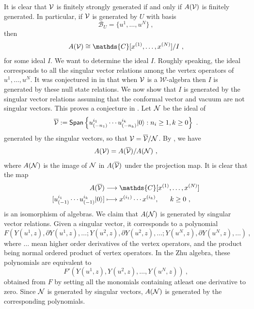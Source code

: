 \documentclass[a4paper,10pt]{article}
\newcommand{\C}{\mathds{C}}
\newcommand{\ov}[1]{\overline{#1}}
\def\CN {{\cal N}}
\def\CV {{\cal V}}
\begin{document}
It is clear that $\CV$ is finitely strongly generated if and only if $A(\CV)$ is finitely generated. In particular, if $\CV$ is generated by $U$ with basis 
\begin{equation}
    \mathcal{B}_U=\{u^1,\dots,u^N\}~,
\end{equation}
then 
\begin{equation}
    A(\CV)\cong\C[x^{(1)},\dots,x^{(N)}]/I~,
\end{equation}
for some ideal $I$. We want to determine the ideal $I$. Roughly speaking, the ideal corresponds to all the singular vector relations among the vertex operators of $u^1,\dots,u^N$. It was conjectured in  in \cite{Xie:2019zlb} that when $\CV$ is a $\mathcal{W}$-algebra then $I$ is generated by these null state relations. We now show that $I$ is generated by the singular vector relations assuming that the conformal vector and vacuum are not singular vectors. This proves a conjecture in \cite{Xie:2019zlb}. Let $\CN$ be the ideal of 
\begin{equation}
\ov{\CV}:= \mathsf{Span}\left\{u^{i_1}_{(-n_1)}\cdots u^{i_k}_{(-n_k)}|0\rangle:n_i\geq 1,k\geq 0\right\}~.   
\end{equation}
generated by the singular vectors, so that $\CV=\ov{\CV}/\CN$. 
By \cite[Proposition 1.4.2]{frenkel1992vertex}, we have 
\begin{equation}
A(\CV)=A(\ov{\CV})/A(\CN)~,    
\end{equation}
where $A(\CN)$ is the image of $\CN$ in $A(\ov{\CV})$ under the projection map. It is clear that the map
\begin{equation}
\begin{split}
    A(\ov{\CV})&\longrightarrow\C[x^{(1)},\dots,x^{(N)}] 
    \\
    [u^{i_1}_{(-1)}\cdots u^{i_k}_{(-1)}|0\rangle]&\longmapsto x^{(i_1)}\cdots x^{(i_k)},~~~~~k\geq 0~,
\end{split} 
\end{equation}
is an isomorphism of algebras. 
We claim that $A(\CN)$ is generated by singular vector relations. Given a singular vector, it corresponds to a polynomial 
\begin{equation}
    F(Y(u^1,z),\partial Y(u^1,z),\dots;Y(u^2,z),\partial Y(u^2,z),\dots; Y(u^N,z),\partial Y(u^N,z),\dots)~,
\end{equation}
where $\dots$ mean higher order derivatives of the vertex operators, 
and the product being normal ordered product of vertex operators. In the Zhu algebra, these polynomials are equivalent to  
\begin{equation}
    F'(Y(u^1,z),Y(u^2,z),\dots,Y(u^N,z))~,
\end{equation}
obtained from $F$ by setting all the monomials containing atleast one derivative to zero. Since $\CN$ is generated by singular vectors,  $A(\CN)$ is generated by the corresponding polynomials.
\end{document}
